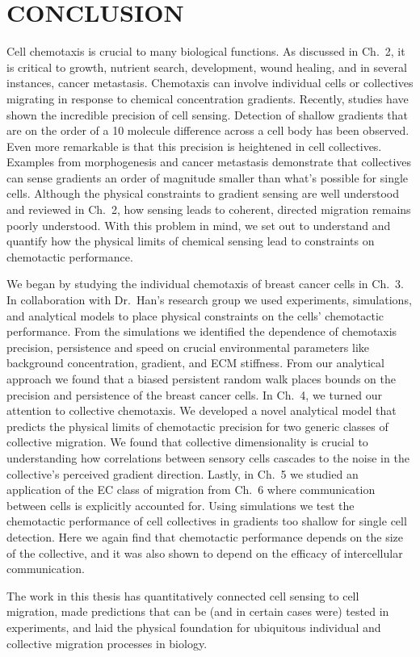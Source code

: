 
\chapter{CONCLUSION}

\noindent
Cell chemotaxis is crucial to many biological functions. As discussed in Ch.\ 2, it is critical to growth, nutrient search, development, wound healing, and in several instances, cancer metastasis. Chemotaxis can involve individual cells or collectives migrating in response to chemical concentration gradients. Recently, studies have shown the incredible precision of cell sensing. Detection of shallow gradients that are on the order of a 10 molecule difference across a cell body has been observed. Even more remarkable is that this precision is heightened in cell collectives. Examples from morphogenesis and cancer metastasis demonstrate that collectives can sense gradients an order of magnitude smaller than what's possible for single cells. Although the physical constraints to gradient sensing are well understood and reviewed in Ch.\ 2, how sensing leads to coherent, directed migration remains poorly understood. With this problem in mind, we set out to understand and quantify how the physical limits of chemical sensing lead to constraints on chemotactic performance.

We began by studying the individual chemotaxis of breast cancer cells in Ch.\ 3. In collaboration with Dr.\ Han's research group we used experiments, simulations, and analytical models to place physical constraints on the cells' chemotactic performance. From the simulations we identified the dependence of chemotaxis precision, persistence and speed on crucial environmental parameters like background concentration, gradient, and ECM stiffness. From our analytical approach we found that a biased persistent random walk places bounds on the precision and persistence of the breast cancer cells. In Ch.\ 4, we turned our attention to collective chemotaxis. We developed a novel analytical model that predicts the physical limits of chemotactic precision for two generic classes of collective migration. We found that collective dimensionality is crucial to understanding how correlations between sensory cells cascades to the noise in the collective's perceived gradient direction. Lastly, in Ch.\ 5 we studied an application of the EC class of migration from Ch.\ 6 where communication between cells is explicitly accounted for. Using simulations we test the chemotactic performance of cell collectives in gradients too shallow for single cell detection. Here we again find that chemotactic performance depends on the size of the collective, and it was also shown to depend on the efficacy of intercellular communication.

The work in this thesis has quantitatively connected cell sensing to cell migration, made predictions that can be (and in certain cases were) tested in experiments, and laid the physical foundation for ubiquitous individual and collective migration processes in biology.
